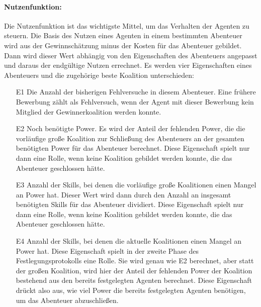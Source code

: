 \documentclass[fleqn,10pt]{SelfArx} %
\begin{document}
\paragraph{Nutzenfunktion:}
Die Nutzenfunktion ist das wichtigste Mittel, um das Verhalten der Agenten zu steuern. Die Basis des Nutzen eines Agenten in einem bestimmten Abenteuer wird aus der Gewinnschätzung minus der Kosten für das Abenteuer gebildet. Dann wird dieser Wert abhängig von den Eigenschaften des Abenteuers angepasst und daraus der endgültige Nutzen errechnet. Es werden vier Eigenschaften eines Abenteuers und die zugehörige beste Koalition unterschieden:
\begin{itemize}
  \item[E1] Die Anzahl der bisherigen Fehlversuche in diesem Abenteuer. Eine frühere Bewerbung zählt als Fehlversuch, wenn der Agent mit dieser Bewerbung kein Mitglied der Gewinnerkoalition werden konnte.
  \item[E2] Noch benötigte Power. Es wird der Anteil der fehlenden Power, die die vorläufige große Koalition zur Schließung des Abenteuers an der gesamten benötigten Power für das Abenteuer berechnet. Diese Eigenschaft spielt nur dann eine Rolle, wenn keine Koalition gebildet werden konnte, die das Abenteuer geschlossen hätte.
  \item[E3] Anzahl der Skills, bei denen die vorläufige große Koalitionen einen Mangel an Power hat. Dieser Wert wird dann durch den Anzahl an insgesamt benötigten Skills für das Abenteuer dividiert. Diese Eigenschaft spielt nur dann eine Rolle, wenn keine Koalition gebildet werden konnte, die das Abenteuer geschlossen hätte.
  \item[E4] Anzahl der Skills, bei denen die aktuelle Koalitionen einen Mangel an Power hat. Diese Eigenschaft spielt in der zweite Phase des Festlegungsprotokolls eine Rolle. Sie wird genau wie E2 berechnet, aber statt der großen Koalition, wird hier der Anteil der fehlenden Power der Koalition bestehend aus den bereits festgelegten Agenten berechnet. Diese Eigenschaft drückt also aus, wie viel Power die bereits festgelegten Agenten benötigen, um das Abenteuer abzuschließen. 
\end{itemize}
\end{document}
